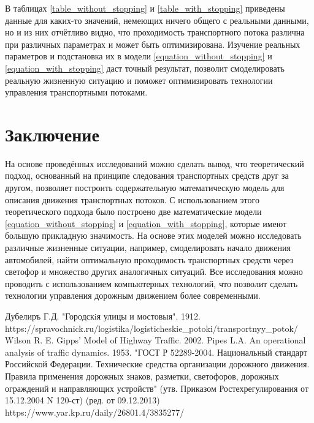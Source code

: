 \documentclass[12pt, a4paper]{extarticle}
\numberwithin{equation}{section}
\begin{document}
В таблицах \eqref{table_without_stopping} и \eqref{table_with_stopping} приведены данные для каких-то значений, немеющих ничего общего с реальными данными, но и из них отчётливо видно, что проходимость транспортного потока различна при различных параметрах и может быть оптимизирована. Изучение реальных параметров и подстановка их в модели \eqref{equation_without_stopping} и \eqref{equation_with_stopping} даст точный результат, позволит смоделировать реальную жизненную ситуацию и поможет оптимизировать технологии управления транспортными потоками.

\vspace{\baselineskip} \vspace{\baselineskip} \vspace{\baselineskip} 
\vspace{\baselineskip} \vspace{\baselineskip} \vspace{\baselineskip}
\hspace{0pt}

\newpage
\section*{Заключение}
На основе проведённых исследований можно сделать вывод, что теоретический подход, основанный на принципе следования транспортных средств друг за другом, позволяет построить содержательную математическую модель для описания движения транспортных потоков. С использованием этого теоретического подхода было построено две математические модели  \eqref{equation_without_stopping} и \eqref{equation_with_stopping}, которые имеют большую прикладную значимость. На основе этих моделей можно исследовать различные жизненные ситуации, например, смоделировать начало движения автомобилей, найти оптимальную проходимость транспортных средств через светофор и множество других аналогичных ситуаций. Все исследования можно проводить с использованием компьютерных технологий, что позволит сделать технологии управления дорожным движением более современными.

\newpage

\begin{thebibliography}{**}
	Дубелиръ Г.Д. "Городскiя улицы и мостовыя". 1912.
	https://spravochnick.ru/logistika/logisticheskie\_potoki/transportnyy\_potok/
	Wilson R. E. Gipps’ Model of Highway Traffic. 2002.
	Pipes L.A. An operational analysis of traffic
 dynamics. 1953. 
	"ГОСТ Р 52289-2004. Национальный стандарт Российской Федерации. Технические средства организации дорожного движения. Правила применения дорожных знаков, разметки, светофоров, дорожных ограждений и направляющих устройств" (утв. Приказом Ростехрегулирования от 15.12.2004 N 120-ст) (ред. от 09.12.2013)
	https://www.yar.kp.ru/daily/26801.4/3835277/
\end{thebibliography}
\end{document}
